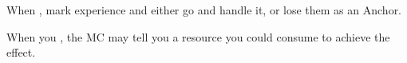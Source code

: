 \begin{multicols}{3}
\begin{move}
  \end{move}


  \SEPARATOR

  \begin{move}
    When , mark experience and either go and handle it, or lose them as an Anchor.

  \end{move}

  \SEPARATOR

  \begin{move}
    When you , the MC may tell you a resource you could consume to achieve the effect.

  \end{move}

\end{multicols}

